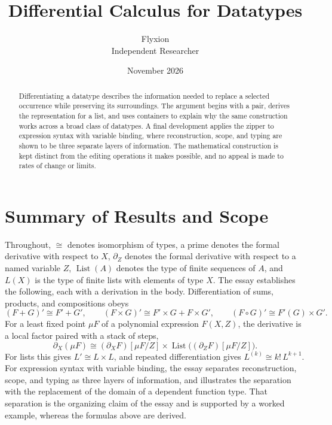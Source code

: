 \documentclass[11pt]{article}
\title{Differential Calculus for Datatypes}
\author{Flyxion\\Independent Researcher}
\date{November 2026}
\begin{document}
\maketitle

\begin{abstract}
Differentiating a datatype describes the information needed to replace a selected occurrence while preserving its surroundings. The argument begins with a pair, derives the representation for a list, and uses containers to explain why the same construction works across a broad class of datatypes. A final development applies the zipper to expression syntax with variable binding, where reconstruction, scope, and typing are shown to be three separate layers of information. The mathematical construction is kept distinct from the editing operations it makes possible, and no appeal is made to rates of change or limits.
\end{abstract}

\section*{Summary of Results and Scope}

Throughout, $\cong$ denotes isomorphism of types, a prime denotes the formal derivative with respect to $X$, $\partial_Z$ denotes the formal derivative with respect to a named variable $Z$, $\operatorname{List}(A)$ denotes the type of finite sequences of $A$, and $L(X)$ is the type of finite lists with elements of type $X$. The essay establishes the following, each with a derivation in the body. Differentiation of sums, products, and compositions obeys
\[
(F+G)'\cong F'+G',\qquad (F\times G)'\cong F'\times G+F\times G',\qquad (F\circ G)'\cong F'(G)\times G'.
\]
For a least fixed point $\mu F$ of a polynomial expression $F(X,Z)$, the derivative is a local factor paired with a stack of steps,
\[
\partial_X(\mu F)\cong(\partial_X F)[\mu F/Z]\times\operatorname{List}\bigl((\partial_Z F)[\mu F/Z]\bigr).
\]
For lists this gives $L'\cong L\times L$, and repeated differentiation gives $L^{(k)}\cong k!\,L^{k+1}$. For expression syntax with variable binding, the essay separates reconstruction, scope, and typing as three layers of information, and illustrates the separation with the replacement of the domain of a dependent function type. That separation is the organizing claim of the essay and is supported by a worked example, whereas the formulas above are derived.
\end{document}
